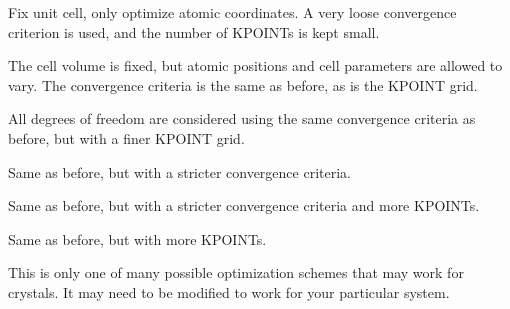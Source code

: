 \begin{DoxyEnumerate}
\item Fix unit cell, only optimize atomic coordinates. A very loose convergence criterion is used, and the number of K\+P\+O\+I\+N\+Ts is kept small.
\item The cell volume is fixed, but atomic positions and cell parameters are allowed to vary. The convergence criteria is the same as before, as is the K\+P\+O\+I\+N\+T grid.
\item All degrees of freedom are considered using the same convergence criteria as before, but with a finer K\+P\+O\+I\+N\+T grid.
\item Same as before, but with a stricter convergence criteria.
\item Same as before, but with a stricter convergence criteria and more K\+P\+O\+I\+N\+Ts.
\item Same as before, but with more K\+P\+O\+I\+N\+Ts.
\end{DoxyEnumerate}

This is only one of many possible optimization schemes that may work for crystals. It may need to be modified to work for your particular system. 